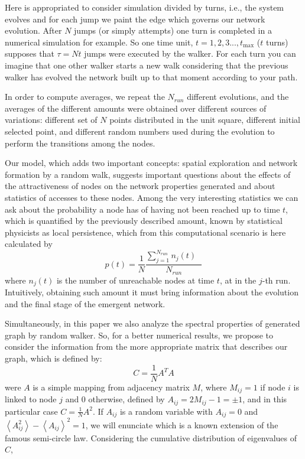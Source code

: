 \documentclass[3p, 11pt]{elsarticle}
\begin{document}
Here is appropriated to consider simulation divided by turns, i.e., the
system evolves and for each jump we paint the edge which governs our network
evolution. After $N$ jumps (or simply attempts) one turn is completed in a
numerical simulation for example. So one time unit, $t=1,2,3...,t_{\max }$ ($%
t$ turns) supposes that $\tau =Nt$ jumps were executed by the walker. For
each turn you can imagine that one other walker starts a new walk
considering that the previous walker has evolved the network built up to
that moment according to your path.

In order to compute averages, we repeat the $N_{run}$ different evolutions,
and the averages of the different amounts were obtained over different
sources of variations: different set of $N$ points distributed in the unit
square, different initial selected point, and different random numbers used
during the evolution to perform the transitions among the nodes.

Our model, which adds two important concepts: spatial exploration and
network formation by a random walk, suggests important questions about the
effects of the attractiveness of nodes on the network properties generated
and about statistics of accesses to these nodes. Among the very interesting
statistics we can ask about the probability a node has of having not been
reached up to time $t$, which is quantified by the previously described
amount, known by statistical physicists as local persistence, which from
this computational scenario is here calculated by 
\begin{equation}
p(t)=\frac{1}{N}\frac{\sum\limits_{j=1}^{N_{run}}n_{j}(t)\text{ }}{N_{run}}
\label{Eq:persitence}
\end{equation}%
where $n_{j}(t)$ is the number of unreachable nodes at time $t$, at in the $%
j $-th run. Intuitively, obtaining such amount it must bring information
about the evolution and the final stage of the emergent network.

Simultaneously, in this paper we also analyze the spectral properties of
generated graph by random walker. So, for a better numerical results, we
propose to consider the information from the more appropriate matrix that
describes our graph, which is defined by:%
\begin{equation*}
C=\frac{1}{N}A^{T}A
\end{equation*}%
were $A$ is a simple mapping from adjacency matrix $M$, where $M_{ij}=1$ if
node $i$ is linked to node $j$ and 0 otherwise, defined by $%
A_{ij}=2M_{ij}-1=\pm 1$, and in this particular case $C=\frac{1}{N}A^{2}$.
If $A_{ij}$ is a random variable with $A_{ij}=0$ and $\left\langle
A_{ij}^{2}\right\rangle -\left\langle A_{ij}\right\rangle ^{2}=1$, we will
enunciate which is a known extension of the famous semi-circle law.
Considering the cumulative distribution of eigenvalues of $C$,
\end{document}
